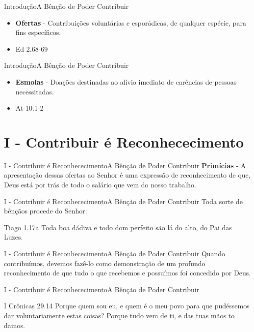 \documentclass[14pt,aspectratio=169]{beamer}
\newcommand{\TT}{A Bênção de Poder Contribuir}
\newcommand{\IN}{Introdução}
\newcommand{\PI}{I - Contribuir é Reconhececimento}
\begin{document}
\begin{frame}{\IN}{\TT}
 \begin{itemize}
  \item \textbf{Ofertas} \pause - Contribuições voluntárias e esporádicas, de qualquer espécie, para fins específicos.
  \item[] Ed 2.68-69
 \end{itemize}
\end{frame}

\begin{frame}{\IN}{\TT}
 \begin{itemize}
  \item \textbf{Esmolas} \pause - Doações destinadas ao alívio imediato de carências de pessoas necessitadas.
  \item[] At 10.1-2
 \end{itemize}
\end{frame}

\section{\PI}
\begin{frame}{\PI}{\TT}\pause
 \textbf{Primícias} - A apresentação dessas ofertas ao Senhor é uma expressão de reconhecimento de que, Deus está por trás de todo o salário que vem do nosso trabalho.
\end{frame}

\begin{frame}{\PI}{\TT}
 Toda sorte de bênçãos procede do Senhor:\pause
 \begin{block}{Tiago 1.17a}
 Toda boa dádiva e todo dom perfeito são lá do alto, do Pai das Luzes.
 \end{block}
\end{frame}

\begin{frame}{\PI}{\TT}
 Quando contribuímos, devemos fazê-lo como demonstração de um profundo reconhecimento de que tudo o que recebemos e possuímos foi concedido por Deus.
\end{frame}

\begin{frame}{\PI}{\TT}
 \begin{block}{I Crônicas 29.14}
 Porque quem sou eu, e quem é o meu povo para que pudéssemos dar voluntariamente estas coisas? Porque tudo vem de ti, e das tuas mãos to damos.
 \end{block}
\end{frame}
\end{document}

